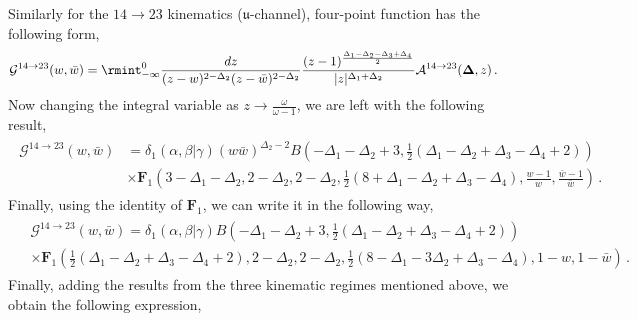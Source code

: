 Similarly for the $14\to 23$ kinematics ($\mathfrak{u}$-channel), four-point function has the following form,
\begin{align}
    \begin{split}
         \mathcal{G}^{14\to 23}(w,\bar w)&=\rmint_{-\infty}^{0}\frac{dz}{(z-w)^{2-\Delta_2}(z-\bar w)^{2-\Delta_2}}\frac{(z-1)^{\frac{\Delta_1-\Delta_2-\Delta_3+\Delta_4}{2}}}{|z|^{\Delta_1+\Delta_2}}\mathcal{A}^{14\to 23}(\mathbf{\Delta},z)\,.
    \end{split}
\end{align}
Now changing the integral variable as $z\to \frac{\omega}{\omega-1}$, we are left with the following result,
\begin{align}
    \begin{split}
         \mathcal{G}^{14\to 23}(w,\bar w)&=\delta_1(\alpha,\beta|\gamma)(w\bar w)^{\Delta_2-2}B(-\Delta _1-\Delta _2+3,\frac{1}{2} \left(\Delta _1-\Delta _2+\Delta _3-\Delta _4+2\right))\\&  \times \mathbf{F}_1(3-\Delta_1-\Delta_2,2-\Delta_2,2-\Delta_2,\frac{1}{2}(8+\Delta_1-\Delta_2+\Delta_3-\Delta_4),\frac{w-1}{w},\frac{\bar w-1}{\bar w})\,.
    \end{split}
\end{align}
Finally, using the identity of $\mathbf{F}_1$, we can write it in the following way, 
\begin{align}
\begin{split}
   &\mathcal{G}^{14\to 23}(w,\bar w) =\delta_1(\alpha,\beta|\gamma)B(-\Delta _1-\Delta _2+3,\frac{1}{2} \left(\Delta _1-\Delta _2+\Delta _3-\Delta _4+2\right))\\&\times\mathbf{F}_1(\frac{1}{2} \left(\Delta _1-\Delta _2+\Delta _3-\Delta _4+2\right),2-\Delta_2,2-\Delta_2,\frac{1}{2}(8-\Delta_1-3\Delta_2+\Delta_3-\Delta_4),1-w,1-\bar w)\,.
    \end{split}
\end{align}
Finally, adding the results from the three kinematic regimes mentioned above, we obtain the following expression,


